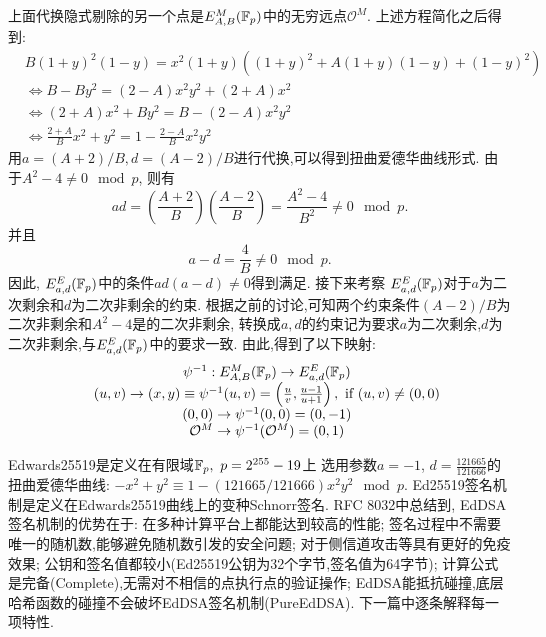 上面代换隐式剔除的另一个点是$E_{A,B}^M(\mathbb{F}_p)$中的无穷远点$\mathcal{O}^M$.
上述方程简化之后得到:
\begin{equation*}
\begin{array}{cc}
& B(1+y)^2(1-y) = x^2(1+y)\left( (1+y)^2 + A(1+y)(1-y) + (1-y)^2  \right) \\
& \iff B-By^2 =  (2-A)x^2y^2 + (2+A)x^2 \\
& \iff (2+A)x^2 + By^2 = B - (2-A)x^2y^2\\
& \iff \frac{2+A}{B}x^2 + y^2 = 1 - \frac{2-A}{B}x^2y^2
\end{array}
\end{equation*}
用$a = (A+2)/B, d = (A-2)/B$进行代换,可以得到扭曲爱德华曲线形式. 
由于$A^2-4\neq0\mod p$, 则有
$$ad = \left(\frac{A+2}{B}\right)\left(\frac{A-2}{B}\right) = \frac{A^2-4}{B^2}\neq 0\mod p.$$
并且
$$a-d = \frac{4}{B} \neq 0 \mod p.$$
因此, $E_{a,d}^E(\mathbb{F}_p)$中的条件$ad(a-d)\neq 0$得到满足.
接下来考察 $E_{a,d}^E(\mathbb{F}_p)$对于$a$为二次剩余和$d$为二次非剩余的约束.
根据之前的讨论,可知两个约束条件$(A-2)/B$为二次非剩余和$A^2-4$是的二次非剩余,
转换成$a,d$的约束记为要求$a$为二次剩余,$d$为二次非剩余,与$ E_{a,d}^E(\mathbb{F}_p)$中的要求一致.
由此,得到了以下映射:
\begin{equation*}
\begin{array}{cc}
& \psi^{-1}: E_{A,B}^M(\mathbb{F}_p) \rightarrow   E_{a,d}^E(\mathbb{F}_p)\\
& (u,v) \rightarrow (x,y) \equiv \psi^{-1}(u, v) = \left( \frac{u}{v}, \frac{u-1}{u+1} \right),\ \text{if}\ (u,v)\neq(0,0)\\
& (0,0) \rightarrow \psi^{-1}(0,0) = (0, -1) \\
& \mathcal{O}^M \rightarrow \psi^{-1}(\mathcal{O}^M) = (0,1)
\end{array}
\end{equation*}

Edwards25519是定义在有限域$\mathbb{F}_p, \ p = 2^{255}-19$上
选用参数$a=-1$, $d = \frac{121665}{121666}$的扭曲爱德华曲线:
$-x^2 + y^2 \equiv 1 - (121665/121666) x^2y^2 \mod p$.
Ed25519签名机制是定义在Edwards25519曲线上的变种Schnorr签名.
RFC 8032中总结到, EdDSA签名机制的优势在于: 在多种计算平台上都能达到较高的性能;
签名过程中不需要唯一的随机数,能够避免随机数引发的安全问题; 
对于侧信道攻击等具有更好的免疫效果; 公钥和签名值都较小(Ed25519公钥为32个字节,签名值为64字节);
计算公式是完备(Complete),无需对不相信的点执行点的验证操作;
EdDSA能抵抗碰撞,底层哈希函数的碰撞不会破坏EdDSA签名机制(PureEdDSA).
下一篇中逐条解释每一项特性.
